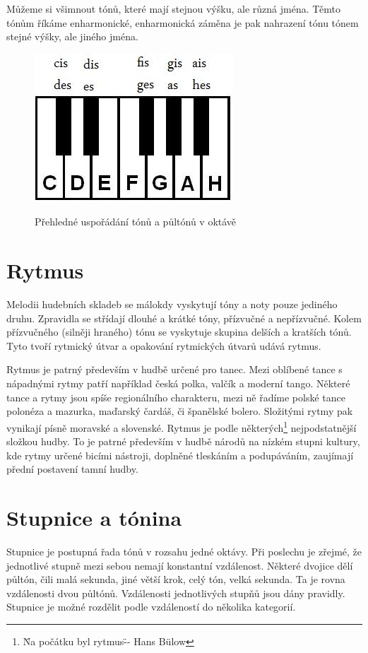 Můžeme si všimnout tónů, které mají stejnou výšku, ale různá jména.
Těmto tónům říkáme enharmonické, enharmonická záměna je pak nahrazení tónu tónem stejné výšky, ale jiného jména.\cite{zenkl}

\begin{figure}[h]\centering
    \centering
    \includegraphics[width=0.4\linewidth]{obrazky/klaviatura.jpg}\\[1pt]  
    \caption{Přehledné uspořádání tónů a půltónů v oktávě \cite{orientaceNaKlaviature}}    
    \label{obrazekRozlozeniKlaviatury}
\end{figure}

\section{Rytmus}
Melodii hudebních skladeb se málokdy vyskytují tóny a noty pouze jediného druhu.
Zpravidla se střídají dlouhé a krátké tóny, přízvučné a nepřízvučné.
Kolem přízvučného (silněji hraného) tónu se vyskytuje skupina delších a kratších tónů.
Tyto tvoří rytmický útvar a opakování rytmických útvarů udává rytmus.
\par
Rytmus je patrný především v hudbě určené pro tanec.
Mezi oblíbené tance s nápadnými rytmy patří například česká polka,
valčík a moderní tango. 
Některé tance a rytmy jsou spíše regionálního charakteru, mezi ně řadíme polské tance polonéza a mazurka, maďarský čardáš, či španělské bolero.
Složitými rytmy pak vynikají písně moravské a slovenské.
Rytmus je podle některých\footnote{\"Na počátku byl rytmus\" -- Hans Bülow} nejpodstatnější složkou hudby.
To je patrné především v hudbě národů na nízkém stupni kultury,
kde rytmy určené bicími nástroji, doplněné tleskáním a podupáváním,
zaujímají přední postavení tamní hudby.\cite{cmiral}

\section{Stupnice a tónina}

Stupnice je postupná řada tónů v rozsahu jedné oktávy.
Při poslechu je zřejmé, že jednotlivé stupně mezi sebou nemají konstantní vzdálenost.\cite{kofron}
Některé dvojice dělí půltón, čili malá sekunda, 
jiné větší krok, celý tón, velká sekunda.
Ta je rovna vzdálenosti dvou půltónů.
Vzdálenosti jednotlivých stupňů jsou dány pravidly.\cite{cmiral}
Stupnice je možné rozdělit podle vzdáleností do několika kategorií.

